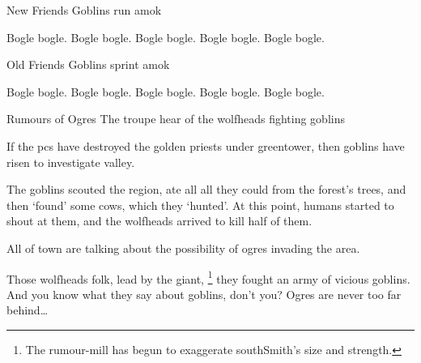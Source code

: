 \label{goblinsEmerge}



\togglefalse{firstsq}
{New Friends}%
{Goblins run amok}%

Bogle bogle.
Bogle bogle.
Bogle bogle.
Bogle bogle.
Bogle bogle.

\togglefalse{firstsq}
{Old Friends}%
{Goblins sprint amok}%

Bogle bogle.
Bogle bogle.
Bogle bogle.
Bogle bogle.
Bogle bogle.


{\squash Rumours of Ogres}%
{The troupe hear of the \glspl{wolfhead} fighting goblins}%

If the \glspl{pc} have destroyed the golden priests under \gls{greentower}, then goblins have risen to investigate \gls{valley}.

\begin{exampletext}
  The goblins scouted the region, ate all all they could from the forest's trees, and then `found' some cows, which they `hunted'.
  At this point, humans started to shout at them, and the \glspl{wolfhead} arrived to kill half of them.
\end{exampletext}

All of \gls{town} are talking about the possibility of ogres invading the area.

\begin{speechtext}
  Those \glspl{wolfhead} folk, lead by the giant,%
  \footnote{The rumour-mill has begun to exaggerate \gls{southSmith}'s size and strength.}
  they fought an army of vicious goblins.
  And you know what they say about goblins, don't you?
  Ogres are never too far behind\ldots
\end{speechtext}
